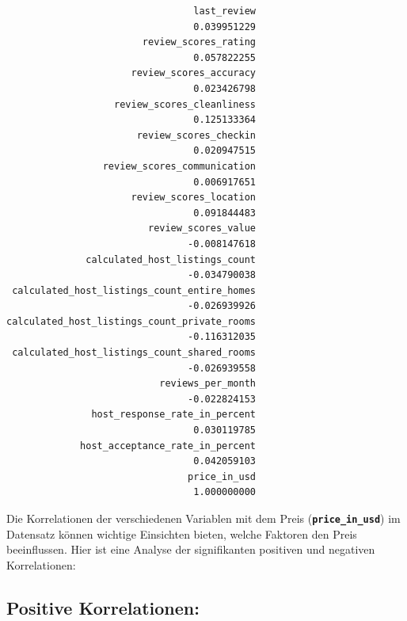\documentclass[
  journal,
]{IEEEtran}%
\begin{document}
\begin{verbatim}
                                 last_review 
                                 0.039951229 
                        review_scores_rating 
                                 0.057822255 
                      review_scores_accuracy 
                                 0.023426798 
                   review_scores_cleanliness 
                                 0.125133364 
                       review_scores_checkin 
                                 0.020947515 
                 review_scores_communication 
                                 0.006917651 
                      review_scores_location 
                                 0.091844483 
                         review_scores_value 
                                -0.008147618 
              calculated_host_listings_count 
                                -0.034790038 
 calculated_host_listings_count_entire_homes 
                                -0.026939926 
calculated_host_listings_count_private_rooms 
                                -0.116312035 
 calculated_host_listings_count_shared_rooms 
                                -0.026939558 
                           reviews_per_month 
                                -0.022824153 
               host_response_rate_in_percent 
                                 0.030119785 
             host_acceptance_rate_in_percent 
                                 0.042059103 
                                price_in_usd 
                                 1.000000000 
\end{verbatim}

Die Korrelationen der verschiedenen Variablen mit dem Preis
(\textbf{\texttt{price\_in\_usd}}) im Datensatz können wichtige
Einsichten bieten, welche Faktoren den Preis beeinflussen. Hier ist eine
Analyse der signifikanten positiven und negativen Korrelationen:

\hypertarget{positive-korrelationen}{%
\subsection{\texorpdfstring{\textbf{Positive
Korrelationen:}}{Positive Korrelationen:}}\label{positive-korrelationen}}
\end{document}
